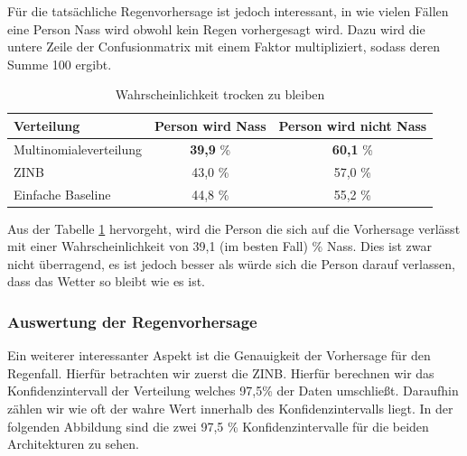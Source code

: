 \noindent Für die tatsächliche Regenvorhersage ist jedoch interessant, in wie vielen Fällen eine Person Nass wird obwohl kein Regen vorhergesagt wird.
Dazu wird die untere Zeile der Confusionmatrix mit einem Faktor multipliziert, sodass deren Summe 100 ergibt.\\
\begin{table}[h]
\begin{tabular}[h]{l|c|c}
Verteilung & Person wird Nass & Person wird nicht Nass  \\
\hline
Multinomialeverteilung & \textbf{39,9} \% & \textbf{60,1} \%  \\
ZINB &43,0 \% & 57,0 \%  \\
Einfache Baseline & 44,8 \% & 55,2 \% 
\end{tabular}
\caption{Wahrscheinlichkeit trocken zu bleiben\label{tab:nass}}
\end{table}

\noindent Aus der Tabelle \ref{tab:nass} hervorgeht, wird die Person die sich auf die Vorhersage verlässt mit einer Wahrscheinlichkeit von 39,1 (im besten Fall) \% Nass.
Dies ist zwar nicht überragend, es ist jedoch besser als würde sich die Person darauf verlassen, dass das Wetter so bleibt wie es ist.

\newpage
\subsubsection{Auswertung der Regenvorhersage}
\noindent Ein weiterer interessanter Aspekt ist die Genauigkeit der Vorhersage für den Regenfall. Hierfür betrachten wir zuerst die ZINB.
Hierfür berechnen wir das Konfidenzintervall der Verteilung welches 97,5\% der Daten umschließt. Daraufhin zählen wir wie oft der wahre Wert innerhalb des Konfidenzintervalls liegt.
In der folgenden Abbildung sind die zwei 97,5 \% Konfidenzintervalle für die beiden Architekturen zu sehen.\\

